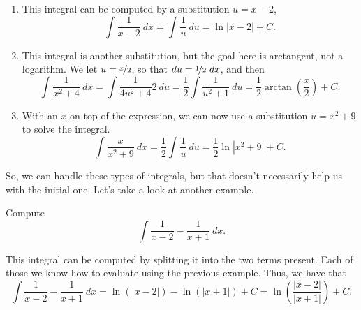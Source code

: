 \documentclass{ximera}
\begin{document}
\begin{exampleSol}
    \begin{enumerate}
        \item This integral can be computed by a substitution $u = x-2$,
            \begin{equation*}
                \int \frac{1}{x-2}\ dx = \int \frac{1}{u}\ du = \ln|x-2| + C.
            \end{equation*}
        \item This integral is another substitution, but the goal here is arctangent, not a logarithm. We let $u = \nicefrac{x}{2}$, so that $du = \nicefrac{1}{2}\ dx$, and then 
            \begin{equation*}
                \int \frac{1}{x^2 + 4}\ dx = \int \frac{1}{4u^2 + 4} 2\ du = \frac{1}{2} \int \frac{1}{u^2 + 1}\ du = \frac{1}{2} \arctan\left( \frac{x}{2} \right) + C.
            \end{equation*}
        \item With an $x$ on top of the expression, we can now use a substitution $u = x^2 + 9$ to solve the integral.
            \begin{equation*}
                \int \frac{x}{x^2 + 9}\ dx = \frac{1}{2} \int \frac{1}{u}\ du = \frac{1}{2} \ln|x^2 + 9| + C.
            \end{equation*}
    \end{enumerate}
\end{exampleSol}

So, we can handle these types of integrals, but that doesn't necessarily help us with the initial one. Let's take a look at another example.

\begin{example}
    Compute 
    \begin{equation*}
        \int \frac{1}{x-2} - \frac{1}{x+1}\ dx.
    \end{equation*}
\end{example}

\begin{exampleSol}
    This integral can be computed by splitting it into the two terms present. Each of those we know how to evaluate using the previous example. Thus, we have that
    \begin{equation*}
        \int \frac{1}{x-2} - \frac{1}{x+1}\ dx = \ln(|x-2|) - \ln(|x+1|) + C = \ln\left(\frac{|x-2|}{|x+1|}\right) + C.
    \end{equation*}
\end{exampleSol}
\end{document}
